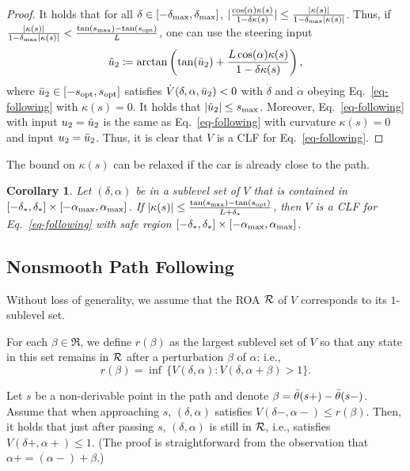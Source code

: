 \documentclass{article}
\theoremstyle{plain}
\newtheorem{corollary}{Corollary}
\theoremstyle{definition}
\theoremstyle{remark}
\newcommand{\smax}{s_\maxtxt}
\newcommand{\sopt}{s_{\mathrm{opt}}}
\newcommand{\deltamax}{\delta_\maxtxt}
\newcommand{\alphamax}{\alpha_\maxtxt}
\begin{document}
\begin{proof}
It holds that for all $\delta\in[-\deltamax,\deltamax]$,
$\lvert\frac{\cos(\alpha)\kappa(s)}{1-\delta\kappa(s)}\rvert\leq
\frac{\lvert\kappa(s)\rvert}{1-\deltamax\lvert\kappa(s)\rvert}$.
Thus, if $\frac{\lvert\kappa(s)\rvert}{1-\deltamax\lvert\kappa(s)\rvert}<\frac{\tan(\smax)-\tan(\sopt)}L$,
one can use the steering input
\[
\hat{u}_2\coloneqq\arctan\left(\tan(\bar{u}_2)+\frac{L\cos(\alpha)\kappa(s)}{1-\delta\kappa(s)}\right),
\]
where $\ubar_2\in[-\sopt,\sopt]$ satisfies $\dot{V}(\delta,\alpha,\bar{u}_2)<0$
with $\dot\delta$ and $\dot\alpha$ obeying Eq.~\eqref{eq-following} with $\kappa(s)=0$.
It holds that $\lvert\uhat_2\rvert\leq\smax$.
Moreover, Eq.~\eqref{eq-following} with input $u_2=\hat{u}_2$
is the same as Eq.~\eqref{eq-following} with curvature $\kappa(s)=0$ and input $u_2=\bar{u}_2$.
Thus, it is clear that $V$ is a CLF for Eq.~\eqref{eq-following}.
\end{proof}

The bound on $\kappa(s)$ can be relaxed if the car is already close to the path.

\begin{corollary}\label{cor-stright-curved}
Let $(\delta,\alpha)$ be in a sublevel set of $V$ that is contained in
$[-\delta_*,\delta_*]\times[-\alphamax,\alphamax]$.
If $\lvert\kappa(s)\rvert\leq \frac{\tan(\smax)-\tan(\sopt)}{L+\delta_*}$,
then $V$ is a CLF for Eq.~\eqref{eq-following} with safe region $[-\delta_*,\delta_*]\times[-\alphamax,\alphamax]$.
\end{corollary}

\subsection{Nonsmooth Path Following}

Without loss of generality, we assume that the ROA $\mathcal{R}$
of $V$ corresponds to its $1$-sublevel set.

For each $\beta\in\Re$, we define $r(\beta)$ as the largest sublevel set of $V$
so that any state in this set remains in $\mathcal{R}$ after a perturbation $\beta$ of $\alpha$: i.e.,
\[
r(\beta)=\inf\,\{V(\delta,\alpha):V(\delta,\alpha+\beta)>1\}.
\]

Let $s$ be a non-derivable point in the path and denote $\beta=\bar{\theta}(s+)-\bar{\theta}(s-)$.
Assume that when approaching $s$, $(\delta,\alpha)$ satisfies $V(\delta-,\alpha-)\leq r(\beta)$.
Then, it holds that just after passing $s$,
$(\delta,\alpha)$ is still in $\mathcal{R}$, i.e., satisfies $V(\delta+,\alpha+)\leq1$.
(The proof is straightforward from the observation that $\alpha+=(\alpha-)+\beta$.)
\end{document}
